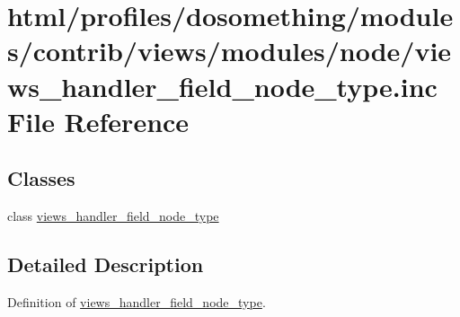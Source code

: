 \hypertarget{views__handler__field__node__type_8inc}{
\section{html/profiles/dosomething/modules/contrib/views/modules/node/views\_\-handler\_\-field\_\-node\_\-type.inc File Reference}
\label{views__handler__field__node__type_8inc}
}
\subsection*{Classes}
\begin{DoxyCompactItemize}
\item 
class \hyperlink{classviews__handler__field__node__type}{views\_\-handler\_\-field\_\-node\_\-type}
\end{DoxyCompactItemize}


\subsection{Detailed Description}
Definition of \hyperlink{classviews__handler__field__node__type}{views\_\-handler\_\-field\_\-node\_\-type}. 
